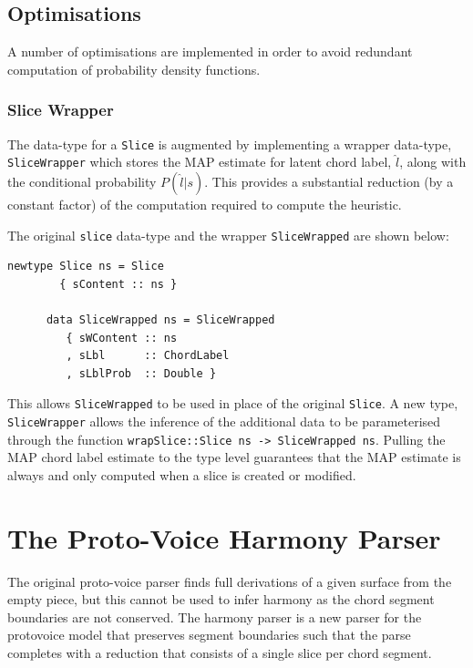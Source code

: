 \documentclass[12pt,a4paper,twoside,openany]{report} \usepackage[pdfborder={0 0 0}]{hyperref}    %
\theoremstyle{definition} \newtheorem{definition}{Definition}[section]
\begin{document}
    \subsection{Optimisations}
    \label{sub:optimisations}

    A number of optimisations are implemented in order to avoid redundant computation of probability density functions.

    \subsubsection{Slice Wrapper}

    The data-type for a \texttt{Slice} is augmented by implementing a wrapper data-type, \texttt{SliceWrapper} which
    stores the MAP estimate for latent chord label, $\hat{l}$, along with the conditional probability $P(\hat{l}|s)$. 
    This provides a substantial reduction (by a constant factor) of the computation required to compute the heuristic.

    The original \texttt{slice} data-type and the wrapper \texttt{SliceWrapped} are shown below:

    \begin{lstlisting}[caption={Slice Wrapper}, captionpos=b] 
      newtype Slice ns = Slice
        { sContent :: ns }

      data SliceWrapped ns = SliceWrapped
         { sWContent :: ns
         , sLbl      :: ChordLabel
         , sLblProb  :: Double }
    \end{lstlisting}

    This allows \texttt{SliceWrapped} to be used in place of the original \texttt{Slice}. A new type,
    \texttt{SliceWrapper} allows the inference of the additional data to be parameterised through the function
    \texttt{wrapSlice::Slice ns -> SliceWrapped ns}. Pulling the MAP chord label estimate to the type level guarantees that
    the MAP estimate is always and only computed when a slice is created or modified.

      \section{The Proto-Voice Harmony Parser}
      \label{sec:protovoiceHarmonyParser}
      The original proto-voice parser finds full derivations of a given surface from the empty piece, but this cannot be
      used to infer harmony as the chord segment boundaries are not conserved. The harmony parser is a new parser for
      the protovoice model that preserves segment boundaries such that the parse completes with a reduction that
      consists of a single slice per chord segment.
\end{document}
